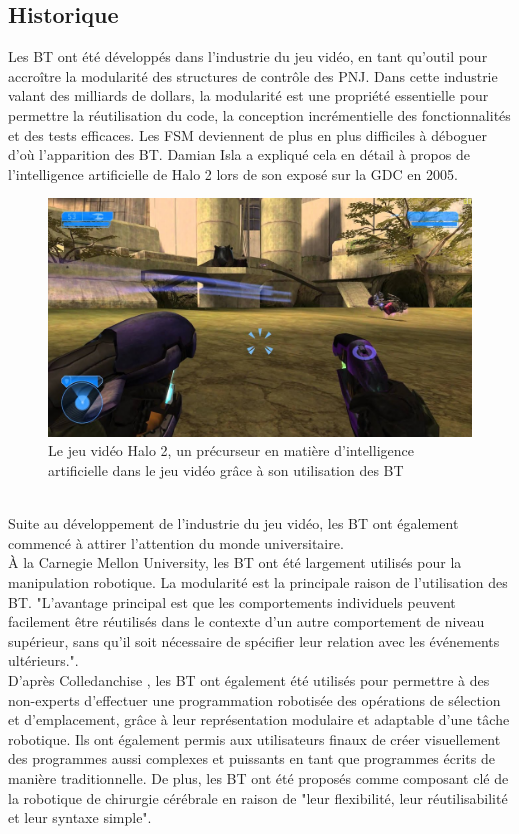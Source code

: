 \documentclass[titlepage]{article}
\begin{document}
		\subsection{Historique}
			Les BT ont été développés dans l’industrie du jeu vidéo, en tant qu’outil pour accroître la modularité des structures de contrôle des PNJ. Dans cette industrie valant des milliards de dollars, la modularité est une propriété essentielle pour permettre la réutilisation du code, la conception incrémentielle des fonctionnalités et des tests efficaces. Les FSM deviennent de plus en plus difficiles à déboguer d'où l'apparition des BT. Damian Isla a expliqué cela en détail à propos de l’intelligence artificielle de Halo 2 lors de son exposé sur la GDC en 2005. \cite{gdc_2005}
			\\
			\begin{figure}[h!]
				\includegraphics[width=\linewidth]{img/halo2.jpg}
				\caption{Le jeu vidéo Halo 2, un précurseur en matière d'intelligence artificielle dans le jeu vidéo grâce à son utilisation des BT \cite{wikipedia_halo}}
				\label{fig:BT1}
			\end{figure}
			\\
			Suite au développement de l'industrie du jeu vidéo, les BT ont également commencé à attirer l'attention du monde universitaire.
			\\
			À la Carnegie Mellon University, les BT ont été largement utilisés pour la manipulation robotique. La modularité est la principale raison de l'utilisation des BT. "L'avantage principal est que les comportements individuels peuvent facilement être réutilisés dans le contexte d'un autre comportement de niveau supérieur, sans qu'il soit nécessaire de spécifier leur relation avec les événements ultérieurs.".\cite{Bagnell_2012_7606}
			\\
			D'après Colledanchise \cite{colledanchise_2017}, les BT ont également été utilisés pour permettre à des non-experts d’effectuer une programmation robotisée des opérations de sélection et d’emplacement, grâce à leur représentation modulaire et adaptable d’une tâche robotique. Ils ont également permis aux utilisateurs finaux de créer visuellement des programmes aussi complexes et puissants en tant que programmes écrits de manière traditionnelle. De plus, les BT ont été proposés comme composant clé de la robotique de chirurgie cérébrale en raison de "leur flexibilité, leur réutilisabilité et leur syntaxe simple".\cite{hu_gong_hannaford_seibel_2015}
	\clearpage
\end{document}
